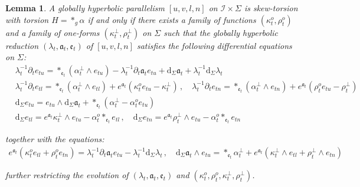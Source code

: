 \documentclass[10pt,reqno,a4paper]{amsart}
\theoremstyle{plain}
\newtheorem{lemma}[thm]{Lemma}
\theoremstyle{definition}
\theoremstyle{remark}
\theoremstyle{remark}
\def\dd{\mathrm{d}}
\def\cI{\mathcal{I}}
\def\fra{\mathfrak{a}}
\def\fre{\mathfrak{e}}
\renewcommand{\(}{ (}
\renewcommand{\)}{ )}
\begin{document}
\begin{lemma}
\label{lemma:skewghevolution1}
A globally hyperbolic parallelism $[u,v,l,n]$ on $\cI\times \Sigma$ is skew-torsion with torsion $H =  \ast_g\alpha$ if and only if there exists a family of functions $(\kappa^o_t,\rho^o_t)$ and a family of one-forms $(\kappa^{\perp}_t , \rho^{\perp}_t)$ on $\Sigma$ such that the globally hyperbolic reduction $(\lambda_t,\fra_t,\fre_t)$ of $[u,v,l,n]$ satisfies the following differential equations on $\Sigma$:
\begin{eqnarray*}
& \lambda_t^{-1} \partial_t e_{tu} = \ast_{\fre_t} (\alpha^{\perp}_t \wedge e_{tu}) - \lambda_t^{-1}\partial_t \fra_t e_{tu} + \dd_{\Sigma} \fra_t + \lambda_t^{-1} \dd_{\Sigma} \lambda_t\\
& \lambda_t^{-1} \partial_t e_{tl} = \ast_{\fre_t} (\alpha^{\perp}_t \wedge e_{tl}) +  e^{\fra_t} (\kappa^o_t e_{tu} - \kappa^{\perp}_t) \, , \quad  \lambda_t^{-1} \partial_t e_{tn} = \ast_{\fre_t} (\alpha^{\perp}_t\wedge e_{tn})  + e^{\fra_t} (\rho^o_t e_{tu} - \rho^{\perp}_t) \\
& \dd_{\Sigma}  e_{tu}  = e_{tu}\wedge \dd_{\Sigma} \fra_t + \ast_{\fre_t}(\alpha^{\perp}_t  - \alpha^o_t e_{tu}) \\
& \dd_{\Sigma} e_{tl} = e^{\fra_t} \kappa^{\perp}_t\wedge e_{tu} - \alpha^o_t \ast_{\fre_t} e_{tl}\, , \quad  \dd_{\Sigma} e_{tn} = e^{\fra_t} \rho^{\perp}_t\wedge e_{tu}  - \alpha^o_t \ast_{\fre_t} e_{tn} 
\end{eqnarray*}
	
\noindent
together with the equations:
\begin{eqnarray*}
 e^{\fra_t}(\kappa^o_t e_{tl} +   \rho^o_t e_{tn} )= \lambda_t^{-1}\partial_t \fra_t e_{tu}  - \lambda_t^{-1} \dd_{\Sigma} \lambda_t   \, , \quad    \dd_{\Sigma} \fra_t \wedge e_{tu} =  \ast_{\fre_t}\alpha^{\perp}_t     +    e^{\fra_t} (\kappa^{\perp}_t \wedge e_{tl} + \rho^{\perp}_t \wedge e_{tn}  )
\end{eqnarray*}

\noindent
further restricting the evolution of $(\lambda_t,\fra_t,\fre_t)$ and $(\kappa^o_t,\rho^o_t, \kappa^{\perp}_t , \rho^{\perp}_t)$.
\end{lemma}
 
\end{document}
